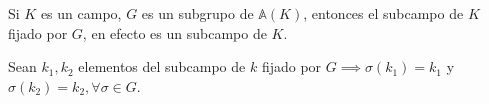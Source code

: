 \begin{lema}
    Si $K$ es un campo, $G$ es un subgrupo de $\mathbb{A}(K)$, entonces el subcampo de $K$ fijado por $G$, en efecto es un subcampo de $K$.
    \begin{dem}
        Sean $k_1,k_2$ elementos del subcampo de $k$ fijado por $G\implies \sigma(k_1)=k_1$ y $\sigma(k_2)=k_2,\forall \sigma\in G$. 
        
    \end{dem}
\end{lema}
